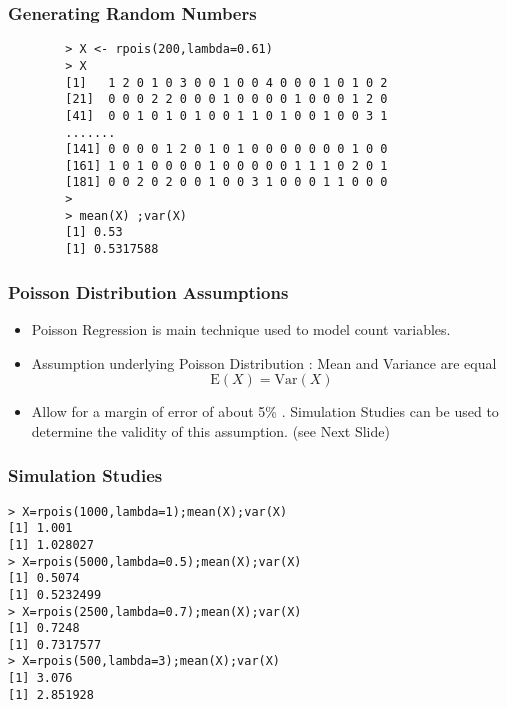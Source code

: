 \documentclass[MASTER.tex]{subfiles}
\begin{document}
\begin{frame}[fragile]
\frametitle{Generating Random Numbers}
	\begin{framed}
		\begin{verbatim}
		> X <- rpois(200,lambda=0.61)
		> X
		[1]   1 2 0 1 0 3 0 0 1 0 0 4 0 0 0 1 0 1 0 2
		[21]  0 0 0 2 2 0 0 0 1 0 0 0 0 1 0 0 0 1 2 0
		[41]  0 0 1 0 1 0 1 0 0 1 1 0 1 0 0 1 0 0 3 1
		.......
		[141] 0 0 0 0 1 2 0 1 0 1 0 0 0 0 0 0 0 1 0 0
		[161] 1 0 1 0 0 0 0 1 0 0 0 0 0 1 1 1 0 2 0 1
		[181] 0 0 2 0 2 0 0 1 0 0 3 1 0 0 0 1 1 0 0 0
		>
		> mean(X) ;var(X) 
		[1] 0.53
		[1] 0.5317588
		\end{verbatim}
	\end{framed}
\end{frame}
\begin{frame}
\frametitle{Poisson Distribution Assumptions}
\Large
\begin{itemize}
\item  Poisson Regression is main technique used to model count variables.

\item Assumption underlying Poisson Distribution : Mean and Variance are equal
\[ \mathrm{E}(X)  = \mathrm{Var}(X) \]

\item Allow for a margin of error of about 5\% . Simulation Studies can be used to determine the validity of this assumption. (see Next Slide)



\end{itemize}
\end{frame}
\begin{frame}[fragile]
\frametitle{Simulation Studies}
\large
	\begin{framed}
		\begin{verbatim}
> X=rpois(1000,lambda=1);mean(X);var(X)
[1] 1.001
[1] 1.028027
> X=rpois(5000,lambda=0.5);mean(X);var(X)
[1] 0.5074
[1] 0.5232499
> X=rpois(2500,lambda=0.7);mean(X);var(X)
[1] 0.7248
[1] 0.7317577
> X=rpois(500,lambda=3);mean(X);var(X)
[1] 3.076
[1] 2.851928
		\end{verbatim}
	\end{framed}
\end{frame}
\end{document}
